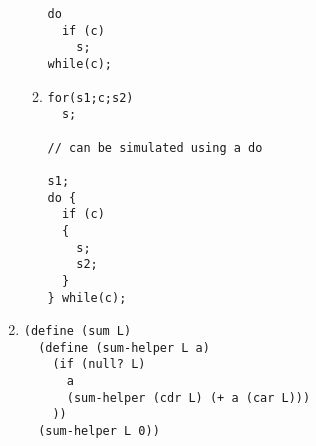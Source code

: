\begin{enumerate}
\begin{enumerate}
\begin{verbatim}
do
  if (c)
    s;
while(c);
\end{verbatim}

\newpage
\item
\begin{verbatim}
for(s1;c;s2)
  s;

// can be simulated using a do

s1;
do {
  if (c)
  {
    s;
    s2;
  }
} while(c);

\end{verbatim}

\end{enumerate}
\item
\begin{verbatim}
(define (sum L)
  (define (sum-helper L a)
    (if (null? L)
      a
      (sum-helper (cdr L) (+ a (car L)))
    ))
  (sum-helper L 0))

\end{verbatim}

\end{enumerate}

